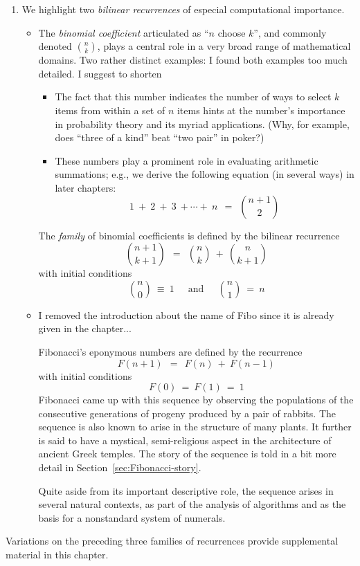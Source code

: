 \begin{enumerate}
\item
We highlight two {\it bilinear recurrences} of especial computational
importance.
  \begin{itemize}
  \item
The {\it binomial coefficient} articulated as ``$n$ choose $k$'', and
commonly denoted $\displaystyle {n \choose k}$, plays a central role
in a very broad range of mathematical domains.  Two rather distinct
examples:
{\Denis I found both examples too much detailed.
I suggest to shorten}
       \begin{itemize}
       \item
The fact that this number indicates the number of ways to select $k$
items from within a set of $n$ items hints at the number's importance
in probability theory and its myriad applications.  (Why, for example,
does ``three of a kind'' beat ``two pair'' in poker?)
       \item
These numbers play a prominent role in evaluating arithmetic
summations; e.g., we derive the following equation (in several ways)
in later chapters:
\[ 1 \ + \ 2 \ + \ 3 \ + \cdots + \ n \ \ = \ \ {{n+1} \choose 2} \]
       \end{itemize}
The {\em family} of binomial coefficients is defined by the bilinear
recurrence
\[ {{n+1} \choose {k+1}} \ \ = \ \ {n \choose k} \ + \ {n \choose {k+1}} \]
with initial conditions
\[ {n \choose 0} \ \equiv \ 1 \ \ \ \ \ \mbox{ and } \ \ \ \ \
{n \choose 1} \ = \ n
\]

  \item
  {\Denis I removed the introduction about the name of Fibo since it is already given in the chapter...}

Fibonacci's eponymous numbers are defined by the recurrence
\[ F(n+1) \ \ = \ \ F(n) \ + \ F(n-1) \]
with initial conditions
\[ F(0) \ = \ F(1) \ = \ 1 \]
Fibonacci came up with this sequence by observing the populations of
the consecutive generations of progeny produced by a pair of rabbits.
The sequence is also known to arise in the structure of many plants.
It further is said to have a mystical, semi-religious aspect in the
architecture of ancient Greek temples.  The story of the sequence is
told in a bit more detail in Section~\ref{sec:Fibonacci-story}.

Quite aside from its important descriptive role, the sequence arises
in several natural contexts, as part of the analysis of algorithms and
as the basis for a nonstandard system of numerals.
  \end{itemize}
\end{enumerate}
Variations on the preceding three families of recurrences provide
supplemental material in this chapter.

